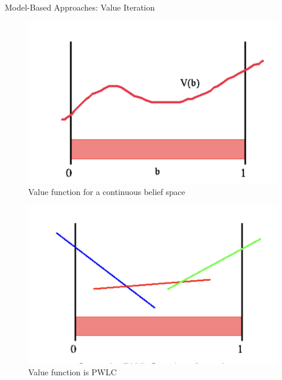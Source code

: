\documentclass[presentation, smaller]{beamer}
\begin{document}
\begin{frame}{Model-Based Approaches: Value Iteration}
\begin{figure}
    \centering
    \includegraphics[scale = 0.2]{pic_1_1.png}
    \caption{Value function for a continuous belief space}
    \label{fig:enter-label}
\end{figure}
 \begin{figure}
    \centering
    \includegraphics[scale = 0.25]{pic_2.png}
    \caption{Value function is PWLC}
    \label{fig:enter-label}
\end{figure}
\end{frame}
\end{document}
